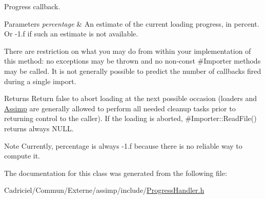Progress callback. 


\begin{DoxyParams}{Parameters}
{\em percentage} & An estimate of the current loading progress, in percent. Or -\/1.\-f if such an estimate is not available.\\
\hline
\end{DoxyParams}
There are restriction on what you may do from within your implementation of this method\-: no exceptions may be thrown and no non-\/const \#\-Importer methods may be called. It is not generally possible to predict the number of callbacks fired during a single import.

\begin{DoxyReturn}{Returns}
Return false to abort loading at the next possible occasion (loaders and \hyperlink{namespace_assimp}{Assimp} are generally allowed to perform all needed cleanup tasks prior to returning control to the caller). If the loading is aborted, \#\-Importer\-::\-Read\-File() returns always N\-U\-L\-L.
\end{DoxyReturn}
\begin{DoxyNote}{Note}
Currently, percentage is always -\/1.\-f because there is no reliable way to compute it. 
\end{DoxyNote}


The documentation for this class was generated from the following file\-:\begin{DoxyCompactItemize}
\item 
Cadriciel/\-Commun/\-Externe/assimp/include/\hyperlink{_progress_handler_8h}{Progress\-Handler.\-h}\end{DoxyCompactItemize}
